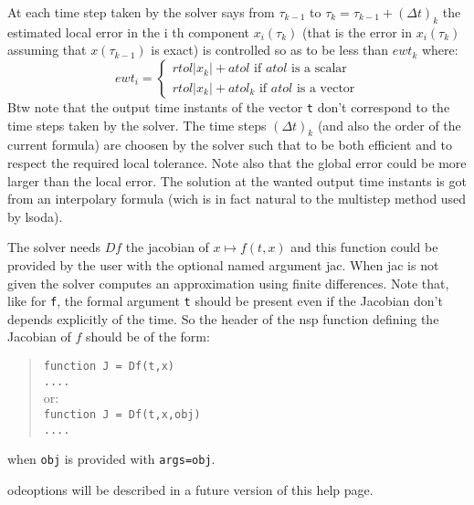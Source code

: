 \begin{mandescription}
At each time step taken by the solver says from $\tau_{k-1}$ to  $\tau_k = \tau_{k-1} + (\Delta t)_k$
the estimated local error in the i th component $x_i(\tau_k)$ (that is the error in 
$x_i(\tau_k)$ assuming that $x(\tau_{k-1})$ is exact) is controlled so as to be less 
than $ewt_k$ where:
$$
ewt_i =
\left\{
\begin{array}{l}
 rtol | x_k | + atol  \mbox{ if } atol \mbox { is a scalar} \\
 rtol | x_k | + atol_k  \mbox{ if } atol \mbox { is a vector}
\end{array}
\right.
$$
 Btw note that the output time instants  of the vector \verb+t+ don't correspond 
to the time steps taken by the solver. The  time steps $(\Delta t)_k$
(and also the order of the current formula) are choosen by the solver such 
that to be both efficient and to respect the required local tolerance. Note 
also that the global error could be more larger than the local error. The 
solution at the wanted output time instants is got from an interpolary 
formula (wich is in fact natural to the multistep method used by lsoda).


The solver needs $Df$ the jacobian of $x \mapsto f(t,x)$ and this function could be provided by the user with the optional named argument 
jac. When jac is not given the solver computes an approximation using finite differences. Note that, like for \verb+f+, the formal argument
\verb+t+ should be present even if the Jacobian don't depends explicitly of the time. So the header of the nsp 
function defining the Jacobian of $f$ should be of the form:
\begin{quote}
{\tt function J = Df(t,x) \\
      ....}\\
or:\\
{\tt function J = Df(t,x,obj) \\
     ....}
\end{quote}
when {\tt obj} is provided with {\tt args=obj}.


odeoptions will be described in a future version of this help page.

\end{mandescription} 

